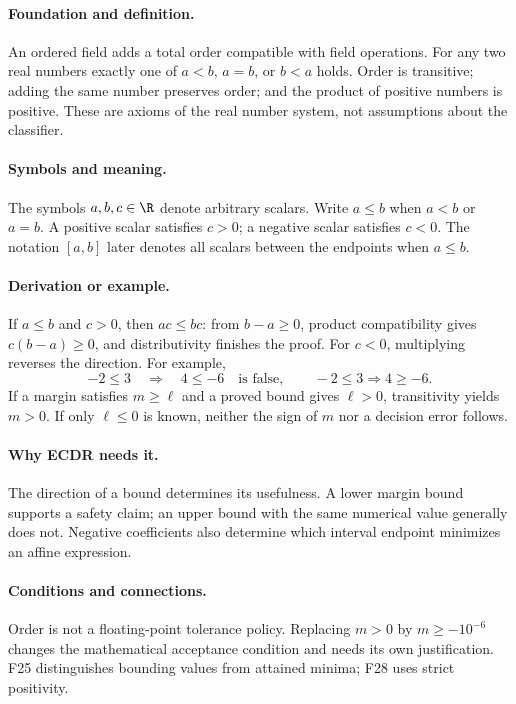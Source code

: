 \paragraph{Foundation and definition.}
An ordered field adds a total order compatible with field operations.
For any two real numbers exactly one of $a<b$, $a=b$, or $b<a$ holds.
Order is transitive; adding the same number preserves order; and the
product of positive numbers is positive. These are axioms of the real
number system, not assumptions about the classifier.
\paragraph{Symbols and meaning.}
The symbols $a,b,c\in\R$ denote arbitrary scalars. Write $a\le b$
when $a<b$ or $a=b$. A positive scalar satisfies $c>0$; a negative scalar
satisfies $c<0$. The notation $[a,b]$ later denotes all scalars between
the endpoints when $a\le b$.
\paragraph{Derivation or example.}
If $a\le b$ and $c>0$, then $ac\le bc$: from $b-a\ge0$, product
compatibility gives $c(b-a)\ge0$, and distributivity finishes the proof.
For $c<0$, multiplying reverses the direction. For example,
\[
 -2\le3\quad\Rightarrow\quad 4\le-6
 \quad\text{is false},\qquad -2\le3\Rightarrow4\ge-6.
\]
If a margin satisfies $m\ge\ell$ and a proved bound gives $\ell>0$,
transitivity yields $m>0$. If only $\ell\le0$ is known, neither the
sign of $m$ nor a decision error follows.
\paragraph{Why ECDR needs it.}
The direction of a bound determines its usefulness. A lower margin bound
supports a safety claim; an upper bound with the same numerical value
generally does not. Negative coefficients also determine which interval
endpoint minimizes an affine expression.
\paragraph{Conditions and connections.}
Order is not a floating-point tolerance policy. Replacing $m>0$ by
$m\ge-10^{-6}$ changes the mathematical acceptance condition and needs
its own justification. F25 distinguishes bounding values from attained
minima; F28 uses strict positivity.

